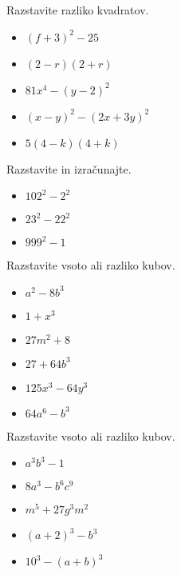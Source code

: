 \begin{multicols}{2}
    
        
            \begin{naloga}
                Razstavite razliko kvadratov.
                \begin{itemize}
                    \item $(f+3)^2-25$ 
                    \item $(2-r)(2+r)$ 
                    \item $81x^4-(y-2)^2$ 
                    \item $(x-y)^2-(2x+3y)^2$ 
                    \item $5(4-k)(4+k)$ 
                \end{itemize}
            \end{naloga}
        
    
        
            \begin{naloga}
                Razstavite in izračunajte.
                \begin{itemize}
                    \item $102^2-2^2$  
                    \item $23^2-22^2$  
                    \item $999^2-1$ 
                \end{itemize}
            \end{naloga}
        
    
        
            \begin{naloga}
                Razstavite vsoto ali razliko kubov.
                \begin{itemize}
                    \item $a^2-8b^3$ 
                    \item $1+x^3$ 
                    \item $27m^2+8$ 
                    \item $27+64b^3$ 
                    \item $125x^3-64y^3$ 
                    \item $64a^6-b^3$ 
                \end{itemize}
            \end{naloga}
        
    
        
            \begin{naloga}
                Razstavite vsoto ali razliko kubov.
                \begin{itemize}
                    \item $a^3b^3-1$ 
                    \item $8a^3-b^6c^9$ 
                    \item $m^5+27g^3m^2$ 
                    \item $(a+2)^3-b^3$ 
                    \item $10^3-(a+b)^3$ 
                \end{itemize}
            \end{naloga}
        

\end{multicols}
